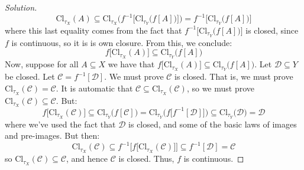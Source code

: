 \documentclass{article}
\theoremstyle{normal}
\begin{document}
\begin{proof}[Solution]
\begin{equation}
            \textrm{Cl}_{\tau_{X}}(A)
            \subseteq\textrm{Cl}_{\tau_{X}}\bigg(
                f^{-1}\Big[\textrm{Cl}_{\tau_{Y}}\big(f[A]\big)\Big]
            \bigg)
            =f^{-1}\Big[\textrm{Cl}_{\tau_{Y}}\big(f[A]\big)\Big]
        \end{equation}
        where this last equality comes from the fact that
        $f^{-1}\Big[\textrm{Cl}_{\tau_{Y}}\big(f[A]\big)\Big]$ is closed, since
        $f$ is continuous, so it is is own closure. From this, we conclude:
        \begin{equation}
            f\big[\textrm{Cl}_{\tau_{X}}(A)\big]
            \subseteq\textrm{Cl}_{\tau_{Y}}\big(f[A]\big)
        \end{equation}
        Now, suppose for all $A\subseteq{X}$ we have that
        $f\big[\textrm{Cl}_{\tau_{X}}(A)\big]\subseteq\textrm{Cl}_{\tau_{Y}}\big(f[A]\big)$.
        Let $\mathcal{D}\subseteq{Y}$ be closed. Let
        $\mathcal{C}=f^{-1}[\mathcal{D}]$. We must prove $\mathcal{C}$ is closed.
        That is, we must prove $\textrm{Cl}_{\tau_{X}}(\mathcal{C})=\mathcal{C}$.
        It is automatic that
        $\mathcal{C}\subseteq\textrm{Cl}_{\tau_{X}}(\mathcal{C})$,
        so we must prove $\textrm{Cl}_{\tau_{X}}(\mathcal{C})\subseteq\mathcal{C}$.
        But:
        \begin{equation}
            f\big[\textrm{Cl}_{\tau_{X}}(\mathcal{C})\big]
            \subseteq\textrm{Cl}_{\tau_{Y}}\big(f[\mathcal{C}]\big)
            =\textrm{Cl}_{\tau_{Y}}\Big(f\big[f^{-1}[\mathcal{D}]\big]\Big)
            \subseteq\textrm{Cl}_{\tau_{Y}}\big(\mathcal{D}\big)
            =\mathcal{D}
        \end{equation}
        where we've used the fact that $\mathcal{D}$ is closed, and some of the
        basic laws of images and pre-images. But then:
        \begin{equation}
            \textrm{Cl}_{\tau_{X}}(\mathcal{C})
            \subseteq{f}^{-1}\Big[
                f\big[
                    \textrm{Cl}_{\tau_{X}}(\mathcal{C})
                \big]
            \Big]
            \subseteq{f}^{-1}[\mathcal{D}]
            =\mathcal{C}
        \end{equation}
        so $\textrm{Cl}_{\tau_{X}}(\mathcal{C})\subseteq\mathcal{C}$, and hence
        $\mathcal{C}$ is closed. Thus, $f$ is continuous.
    \end{proof}
\end{document}
